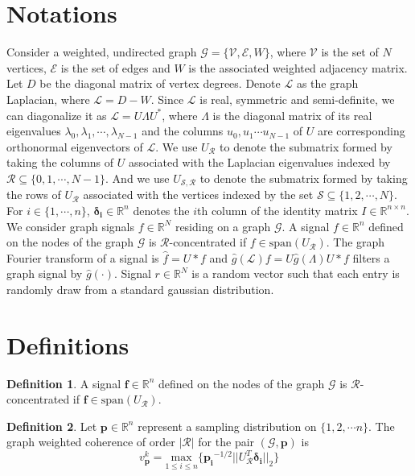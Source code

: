 \documentclass[a4paper]{article}
\newcommand{\R}{\mathcal{R}}
\newcommand{\RR}{\mathbb{R}}
\newcommand{\N}{\mathbb{N}}
\newcommand{\G}{\mathcal{G}}
\newcommand{\V}{\mathcal{V}}
\newcommand{\E}{\mathcal{E}}
\newcommand{\La}{\mathcal{L}}
\newcommand{\UR}{U_{\mathcal{R}}}
\newcommand{\vv}{\mathit{v}}
\theoremstyle{definition}
\newtheorem*{definition}{Definition}
\begin{document}
\section{Notations}
Consider a weighted, undirected graph $\G = \{ \V, \E, W\}$, where $\V$ is the set of $N$ vertices, $\E$ is the set of edges and $W$ is the associated weighted adjacency matrix. Let $D$ be the diagonal matrix of vertex degrees. Denote $\La$ as the graph Laplacian, where $\La = D-W$. Since $\La$ is real, symmetric and semi-definite, we can diagonalize it as $\La =U\Lambda U^*$, where $\Lambda$ is the diagonal matrix of its real eigenvalues $\lambda_0, \lambda_1,\cdots, \lambda_{N-1}$ and the columns $u_0, u_1 \cdots u_{N-1}$ of $U$ are corresponding orthonormal eigenvectors of $\La$. We use $\UR$ to denote the submatrix formed by taking the columns of $U$ associated with the Laplacian eigenvalues indexed by $\mathcal{R} \subseteq \{0,1,\cdots,N-1\}$. And we use $U_{\mathcal{S},\mathcal{R}}$ to denote the submatrix formed by taking the rows of $U_{\mathcal{R}}$ associated with the vertices indexed by the set $\mathcal{S} \subseteq \{1,2,\cdots, N\}$. For $i \in \{1,\cdots,n\}$, $\bm{\delta_i} \in \RR^n$ denotes the $i$th column of the identity matrix $I \in \RR^{n\times n}.$
We consider graph signals $f \in \RR^N$ residing on a graph $\G$. A signal $f \in \RR^n$ defined on the nodes of the graph $\G$ is $\R$-concentrated if $f \in \text{span}(U_{\R})$. The graph Fourier transform of a signal is $\hat{f} = U*f$ and $\hat{g}(\La) f = U\hat{g}(\Lambda)U*f$ filters a graph signal by $\hat{g}(\cdot)$. Signal $r\in \RR^N$ is a random vector such that each entry is randomly draw from a standard gaussian distribution.

\medskip

\section{Definitions}

\begin{definition}
A signal $\bm{f} \in \RR^n$ defined on the nodes of the graph $\G$ is $\R$-concentrated if $\bm{f} \in \text{span}(U_{\R})$.
\end{definition}

\begin{definition}
Let $\bm{p} \in \RR^{n}$ represent a sampling distribution on $\{1,2,\cdots n\}$. The graph weighted coherence of order $|\R| $ for the pair $(\G, \bm{p})$ is
$$ \vv^k_{\bm{p}} = \underset{1\leq i\leq n}{\text{ max }} \{\bm{p_i}^{-1/2} ||U_{\R}^T \bm{\delta_i} ||_2\}$$

\end{definition}
\end{document}
